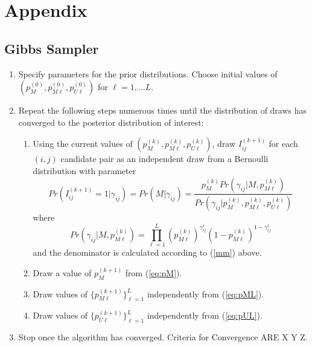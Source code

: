 \documentclass[11pt,reqno]{amsart}
\begin{document}
\newpage




\newpage
\appendix
\section{Appendix}

\subsection{Gibbs Sampler \citep{larsen_2005}}
\label{app:simple_gibbs}
\begin{enumerate}
\item Specify parameters for the prior distributions.  Choose initial values of $\left(p_M^{(0)}, p_{M\ell}^{(0)}, p_{U\ell}^{(0)}\right)$ for $\ell=1,\dots L$.  

\item Repeat the following steps numerous times until the distribution of draws has converged to the posterior distribution of interest:
\begin{enumerate}

\item Using the current values of $\left(p_M^{(k)}, p_{M\ell}^{(k)}, p_{U\ell}^{(k)}\right)$, draw $I_{ij}^{(k+1)}$ for each $(i,j)$ candidate pair as an independent draw from a Bernoulli distribution with parameter
\begin{equation}
Pr\left( I_{ij}^{(k+1)}=1 \Big| \gamma_{ij}\right) = Pr\left(M | \gamma_{ij}\right) = \frac{p_M^{(k)}Pr\left(\gamma_{ij} | M, p_{M\ell}^{(k)} \right)}{Pr\left(\gamma_{ij} \Big | p_M^{(k)}, p_{M\ell}^{(k)}, p_{U\ell}^{(k)}\right)}
\end{equation} where 
$$ Pr\left(\gamma_{ij} | M, p_{M\ell}^{(k)} \right) = \prod_{\ell=1}^L  \left(p_{M\ell}^{(k)}\right)^{\gamma_{ij}^{\ell}}\left(1-p_{M\ell}^{(k)}\right)^{1-\gamma_{ij}^{\ell}}$$ and the denominator is calculated according to (\ref{mm}) above. 
\item Draw a value of $p_M^{(k+1)}$ from (\ref{eq:pM}).
\item Draw values of $\{p_{M\ell}^{(k+1)}\}_{\ell=1}^L$ independently from (\ref{eq:pML}). 
\item Draw values of $\{p_{U\ell}^{(k+1)}\}_{\ell=1}^L$ independently from (\ref{eq:pUL}). 
\end{enumerate}
\item Stop once the algorithm has converged.  Criteria for Convergence ARE X Y Z. %
\end{enumerate}
\end{document}
